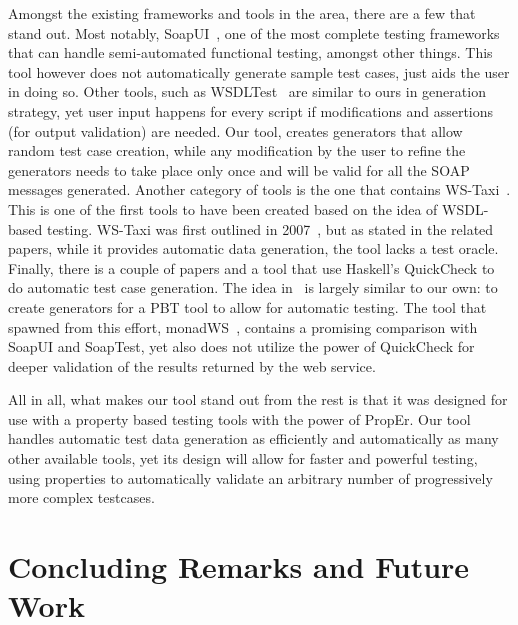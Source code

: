\documentclass[submission,copyright]{eptcs}
\begin{document}
Amongst the existing frameworks and tools in the area, there are a few that 
stand out. 
Most notably, SoapUI~\cite{soapUI}, one of the most complete testing frameworks
that can handle semi-automated functional testing, amongst other things. This 
tool however does not automatically generate sample test cases, just aids the
user in doing so.
Other tools, such as WSDLTest~\cite{wsdltest@IEEE06} are similar to ours in 
generation strategy, yet user input happens for every script if modifications 
and assertions (for output validation) are needed. Our tool, creates generators 
that allow random test case creation, while any modification by the user to
refine the generators needs to take place only once and will be valid for all
the SOAP messages generated.
Another category of tools is the one that contains WS-Taxi~\cite{taxi@IC-08}. 
This is one of the first tools to have been created based on the idea
of WSDL-based testing. WS-Taxi was first outlined in
2007~\cite{partition@AST-07}, but as stated in the related papers,
while it provides automatic data generation, the tool lacks a test oracle.
%
Finally, there is a couple of papers and a tool that use Haskell's
QuickCheck to do automatic test case generation. The idea
in~\cite{ws_quickcheck} is largely similar to our own: to create
generators for a PBT tool to allow for automatic testing. The tool
that spawned from this effort, monadWS~\cite{monadWS@AST-11}, contains
a promising comparison with SoapUI and SoapTest, yet also does not
utilize the power of QuickCheck for deeper validation of the results
returned by the web service.

All in all, what makes our tool stand out from the rest is that it 
was designed for use with a property based testing tools with the 
power of PropEr. Our tool handles automatic test data generation as
efficiently and automatically as many other available tools, yet its
design will allow for faster and powerful testing, using properties 
to automatically validate an arbitrary number of progressively more 
complex testcases.

\section{Concluding Remarks and Future Work}
\end{document}
